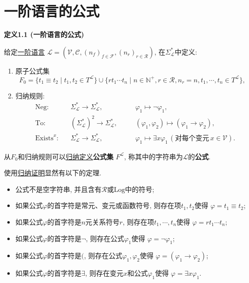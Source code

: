 


\setlength{\abovedisplayskip}{1pt}
\setlength{\belowdisplayskip}{1pt}

\section{一阶语言的公式}

\hypertarget{sec:定义1.1}{}
\noindent\textbf{定义1.1 (一阶语言的公式)}

给定\href{01 一阶语言#nameddest=sec:定义1.1}{一阶语言} $\mathcal{L}=
(\mathcal{V},\mathcal{C},(n_f)_{f\in\mathcal{F}},(n_r)_{r\in\mathcal{R}})$,
在$\Sigma_{\mathcal{L}}^*$中定义:
\begin{enumerate}
    \item 原子公式集
    \[
        F_0=\{t_1\equiv t_2\mid t_1,t_2\in T^{\mathcal{L}}\}\cup
        \{rt_1\cdots t_n\mid n\in\mathbb{N}^+,
        r\in\mathcal{R},n_r=n,t_1,\cdots,t_n\in T^{\mathcal{L}}\},
    \]
    \item 归纳规则:
    \[\begin{aligned}
        &\mathrm{Neg}:&&\Sigma_{\mathcal{L}}^*\to\Sigma_{\mathcal{L}}^*,
        \quad&&\varphi_1\mapsto\neg\varphi_1,\\[-3pt]
        &\mathrm{To}:&&(\Sigma_{\mathcal{L}}^*)^2\to\Sigma_{\mathcal{L}}^*,
        \quad&&(\varphi_1,\varphi_2)\mapsto(\varphi_1\to\varphi_2),\\[-3pt]
        &\mathrm{Exists}^x:&&\Sigma_{\mathcal{L}}^*\to\Sigma_{\mathcal{L}}^*,
        \quad&&\varphi_1\mapsto\exists x\varphi_1
        \,(\text{对每个变元}\,x\in\mathcal{V}).
    \end{aligned}\]
\end{enumerate}
从$F_0$和归纳规则可以\href{01 一阶语言#nameddest=sec:定义A1.1}{归纳定义}\textbf{公式集}
$F^{\mathcal{L}}$, 称其中的字符串为$\mathcal{L}$的\textbf{公式}.

\vspace{10pt}

使用\href{01 一阶语言#nameddest=sec:定理A1.2}{归纳证明}显然有以下的定理.
\begin{itemize}
    \item 公式不是空字符串, 并且含有$\mathcal{R}$或$\mathrm{Log}$中的符号;
    \item 如果公式$\varphi$的首字符是常元、变元或函数符号, 则存在项$t_1,t_2$使得
    $\varphi=t_1\equiv t_2$;
    \item 如果公式$\varphi$的首字符是$n$元关系符号$r$, 则存在项$t_1,\cdots,t_n$使得
    $\varphi=rt_1\cdots t_n$;
    \item 如果公式$\varphi$的首字符是$\neg$, 则存在公式$\varphi_1$使得
    $\varphi=\neg\varphi_1$;
    \item 如果公式$\varphi$的首字符是$($, 则存在公式$\varphi_1,\varphi_2$使得
    $\varphi=(\varphi_1\to\varphi_2)$;
    \item 如果公式$\varphi$的首字符是$\exists$, 则存在变元$x$和公式$\varphi_1$使得
    $\varphi=\exists x\varphi_1$.
\end{itemize}

